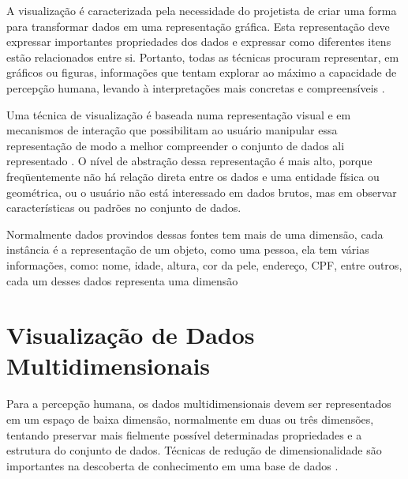 
A visualização é caracterizada pela necessidade do projetista de criar uma forma para transformar dados em uma representação gráfica. Esta representação deve expressar importantes propriedades dos dados e expressar como diferentes itens estão relacionados entre si. Portanto, todas as técnicas procuram representar, em gráficos ou figuras, informações que tentam explorar ao máximo a capacidade de percepção humana, levando à interpretações mais concretas e compreensíveis \cite{vaz2004visualizacao}.

Uma técnica de visualização é baseada numa representação visual e em mecanismos de interação que possibilitam ao usuário manipular essa representação de modo a melhor compreender o conjunto de dados ali representado \cite{freitas2001introduccao}. O nível de abstração dessa representação é mais alto, porque freqüentemente não há relação direta entre os dados e uma entidade física ou geométrica, ou o usuário não está interessado em dados brutos, mas em observar características ou padrões no conjunto de dados. 

Normalmente dados provindos dessas fontes tem mais de uma dimensão, cada instância é a representação de um objeto, como uma pessoa, ela tem várias informações, como: nome, idade, altura, cor da pele, endereço, CPF, entre outros,  cada um desses dados representa uma dimensão 

\section{Visualização de Dados Multidimensionais}
\label{VisMultidimensionais-sec}

 Para a percepção humana, os dados multidimensionais devem ser representados em um espaço de baixa dimensão, normalmente em duas ou três dimensões, tentando preservar mais fielmente possível determinadas propriedades e a estrutura do conjunto de dados.  Técnicas de redução de dimensionalidade são importantes na descoberta de conhecimento em uma base de dados \cite{dzemyda2013multidimensional}.
 

